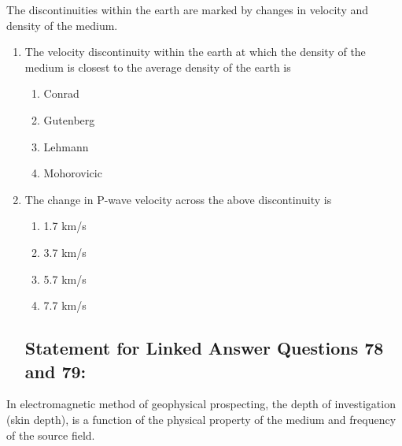 \documentclass[journal,12pt,onecolumn]{IEEEtran}
\theoremstyle{remark}
\begin{document}
The discontinuities within the earth are marked by changes in velocity and density of the medium.
\vspace{0.5cm}

\begin{enumerate}[resume]

\item The velocity discontinuity within the earth at which the density of the medium is closest to the average density of the earth is

\begin{multicols}{4}
\begin{enumerate}
\item Conrad  
\item Gutenberg  
\item Lehmann  
\item Mohorovicic  
\end{enumerate}
\end{multicols}
\vspace{0.5cm}

\item The change in P-wave velocity across the above discontinuity is

\begin{multicols}{4}
\begin{enumerate}
\item 1.7 km/s  
\item 3.7 km/s  
\item 5.7 km/s  
\item 7.7 km/s  
\end{enumerate}
\end{multicols}
\vspace{0.5cm}

\subsection*{Statement for Linked Answer Questions 78 and 79:}
\end{enumerate}
\vspace{0.5cm}

In electromagnetic method of geophysical prospecting, the depth of investigation (skin depth), is a function of the physical property of the medium and frequency of the source field.
\vspace{0.5cm}
\end{document}
